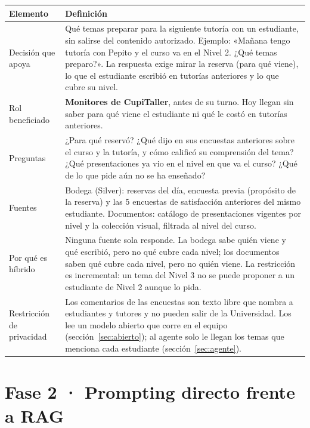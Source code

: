 \documentclass[11pt,letterpaper]{article}
\begin{document}
\begin{table}[H]\small\renewcommand{\arraystretch}{1.2}
\begin{tabularx}{\textwidth}{>{\raggedright\arraybackslash}p{}L}
\toprule
\textbf{Elemento} & \textbf{Definición} \\
\midrule
Decisión que apoya & Qué temas preparar para la siguiente tutoría con un estudiante, sin salirse del contenido autorizado. Ejemplo: «Mañana tengo tutoría con Pepito y el curso va en el Nivel 2. ¿Qué temas preparo?». La respuesta exige mirar la reserva (para qué viene), lo que el estudiante escribió en tutorías anteriores y lo que cubre su nivel. \\
Rol beneficiado & \textbf{Monitores de CupiTaller}, antes de su turno. Hoy llegan sin saber para qué viene el estudiante ni qué le costó en tutorías anteriores. \\
Preguntas & ¿Para qué reservó? ¿Qué dijo en sus encuestas anteriores sobre el curso y la tutoría, y cómo calificó su comprensión del tema? ¿Qué presentaciones ya vio en el nivel en que va el curso? ¿Qué de lo que pide aún no se ha enseñado? \\
Fuentes & Bodega (Silver): reservas del día, encuesta previa (propósito de la reserva) y las 5 encuestas de satisfacción anteriores del mismo estudiante. Documentos: catálogo de presentaciones vigentes por nivel y la colección visual, filtrada al nivel del curso. \\
Por qué es híbrido & Ninguna fuente sola responde. La bodega sabe quién viene y qué escribió, pero no qué cubre cada nivel; los documentos saben qué cubre cada nivel, pero no quién viene. La restricción es incremental: un tema del Nivel 3 no se puede proponer a un estudiante de Nivel 2 aunque lo pida. \\
Restricción de privacidad & Los comentarios de las encuestas son texto libre que nombra a estudiantes y tutores y no pueden salir de la Universidad. Los lee un modelo abierto que corre en el equipo (sección~\ref{sec:abierto}); al agente solo le llegan los temas que menciona cada estudiante (sección~\ref{sec:agente}). \\
\bottomrule
\end{tabularx}
\end{table}

\section{Fase 2 · Prompting directo frente a RAG}
\end{document}
